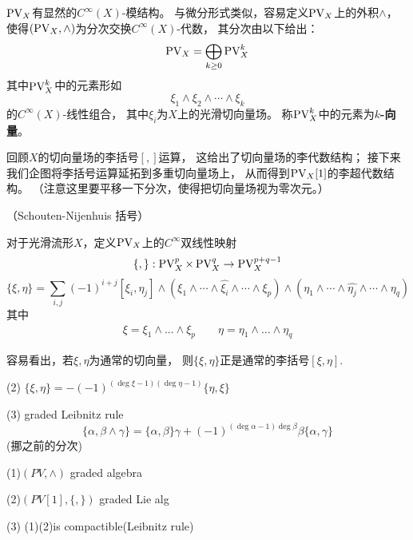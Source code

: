 $\operatorname{PV}_X$有显然的$C^{\infty}(X)$-模结构。
与微分形式类似，容易定义$\operatorname{PV}_X$上的外积$\wedge$，
使得$(\operatorname{PV}_X,\wedge)$为分次交换$C^{\infty}(X)$-代数，
其分次由以下给出：
$$\operatorname{PV}_X=\bigoplus_{k\geq 0}\operatorname{PV}^k_X$$
其中$\operatorname{PV}^k_X$中的元素形如
$$\xi_1\wedge\xi_2\wedge\cdots\wedge\xi_k$$
的$C^{\infty}(X)$-线性组合，
其中$\xi_i$为$X$上的光滑切向量场。
称$\operatorname{PV}^k_X$中的元素为\textbf{$k$-向量}。

回顾$X$的切向量场的李括号$[,]$运算，
这给出了切向量场的李代数结构；
接下来我们企图将李括号运算延拓到多重切向量场上，
从而得到$\operatorname{PV}_X[1]$的李超代数结构。
（注意这里要平移一下分次，使得把切向量场视为零次元。）

\begin{definition}（Schouten-Nijenhuis 括号）

对于光滑流形$X$，定义$\operatorname{PV}_X$上的$C^{\infty}$双线性映射
$$\{,\}:\operatorname{PV}^p_X\times \operatorname{PV}^q_X\to \operatorname{PV}^{p+q-1}_X$$
$$\{\xi,\eta\}=\sum_{i,j}(-1)^{i+j}[\xi_i,\eta_j]\wedge
(\xi_1\wedge\cdots\wedge\widehat{\xi_i}\wedge\cdots\wedge\xi_p)
\wedge(\eta_1\wedge\cdots\wedge\widehat{\eta_j}\wedge\cdots\wedge\eta_q)$$
其中
\begin{eqnarray*}
\xi=\xi_1\wedge...\wedge\xi_p\quad\quad
\eta=\eta_1\wedge...\wedge\eta_q
\end{eqnarray*}
\end{definition}
容易看出，若$\xi,\eta$为通常的切向量，
则$\{\xi,\eta\}$正是通常的李括号$[\xi,\eta]$.



(2) $\{\xi,\eta\}=-(-1)^{(\deg\xi-1)(\deg\eta-1)}\{\eta,\xi\}$



(3) graded  Leibnitz rule
$$\{\alpha,\beta\wedge\gamma\}
=\{\alpha,\beta\}\gamma+(-1)^{(\deg\alpha-1)\deg\beta}
\beta\{\alpha,\gamma\}$$
(挪之前的分次)

\begin{prop}

(1)$(PV,\wedge)$ graded algebra

(2)$(PV[1],\{,\})$ graded Lie alg

(3) (1)(2)is compactible(Leibnitz rule)

\end{prop}

